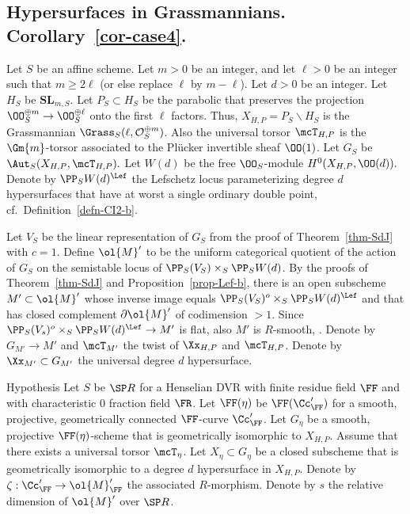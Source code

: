 \subsection{Hypersurfaces in Grassmannians. Corollary~\ref{cor-case4}.} \label{subsec-Grass}

\begin{nota}\label{notat-CI-c}
Let $S$ be an affine scheme. Let $m>0$ be an integer, and let $\ell>0$ be an integer such that $m\geq 2\ell$ (or else replace $\ell$ by $m-\ell$). Let $d>0$ be an integer. Let $H_S$ be $\textbf{SL}_{m,S}$. Let $P_S\subset H_S$ be the parabolic that preserves the projection $\OO_S^{\oplus m} \to \OO_S^{\oplus \ell}$ onto the first $\ell$ factors. Thus, $X_{H,P}=P_S\backslash H_S$ is the Grassmannian $\Grass_S(\ell,\mathcal{O}_S^{\oplus m})$. Also the universal torsor $\mcT_{H,P}$ is the $\Gm{m}$-torsor associated to the Pl\"ucker invertible sheaf $\OO(1)$. Let $G_S$ be $\Aut_S(X_{H,P},\mcT_{H,P}).$ Let $W(d)$ be the free $\OO_S$-module $H^0(X_{H,P},\OO(d)).$ Denote by $\PP_S W(d)^{\Lef}$ the Lefschetz locus parameterizing degree $d$ hypersurfaces that have at worst a single ordinary double point, cf.~Definition~\ref{defn-CI2-b}.
\end{nota}

Let $V_S$ be the linear representation of $G_S$ from the proof of Theorem~\ref{thm-SdJ} with $c=1$. Define $\ol{M}'$ to be the uniform categorical quotient of the action of $G_S$ on the semistable locus of $\PP_S(V_S)\times_S \PP_S W(d)$. By the proofs of Theorem~\ref{thm-SdJ} and Proposition~\ref{prop-Lef-b}, there is an open subscheme $M'\subset \ol{M}'$ whose inverse image equals $\PP_S(V_S)^o
\times_S \PP_S W(d)^{\Lef}$ and that has closed complement $\partial \ol{M}'$ of codimension $>1$. Since $\PP_S(V_s)^o\times_S
\PP_S W(d)^{\Lef} \to M'$ is flat, also $M'$ is $R$-smooth, \cite[Proposition~17.7.7]{EGA4}. Denote by $G_{M'}\to M'$ and $\mcT_{M'}$ the twist of $\Xx_{H,P}$ and $\mcT_{H,P}$. Denote by $\Xx_{M'}\subset G_{M'}$ the universal degree $d$ hypersurface.

\begin{enonce}
{Hypothesis} \label{hyp-Grass}
Let $S$ be $\SP R$ for a Henselian DVR with finite residue field $\FF$ and with characteristic $0$ fraction field $\FR$. Let $\FF(\eta)$ be $\FF(\Cc'_{\FF})$ for a smooth, projective, geometrically connected $\FF$-curve $\Cc'_{\FF}$. Let $G_\eta$ be a smooth, projective $\FF(\eta)$-scheme that is geometrically isomorphic to $X_{H,P}$. Assume that there exists a universal torsor $\mcT_\eta$. Let $X_\eta\subset G_\eta$ be a closed subscheme that is geometrically isomorphic to a degree $d$ hypersurface in $X_{H,P}$. Denote by $\zeta:\Cc'_{\FF} \to \ol{M}'_{\FF}$ the associated $R$-morphism. Denote by $s$ the relative dimension of $\ol{M}'$ over $\SP R$.
\end{enonce}

